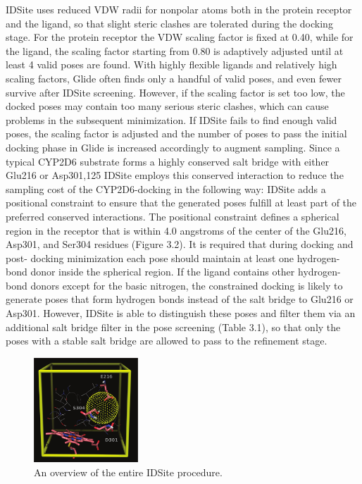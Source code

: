 IDSite uses reduced VDW radii for nonpolar atoms both in the protein receptor and the ligand, so that slight steric clashes are tolerated during the docking stage.
For the protein receptor the VDW scaling factor is fixed at 0.40, while for the ligand, the scaling factor starting from 0.80 is adaptively adjusted until at least 4 valid poses are found.
With highly flexible ligands and relatively high scaling factors, Glide often finds only a handful of valid poses, and even fewer survive after IDSite screening.
However, if the scaling factor is set too low, the docked poses may contain too many serious steric clashes, which can cause problems in the subsequent minimization.
If IDSite fails to find enough valid poses, the scaling factor is adjusted and the number of poses to pass the initial docking phase in Glide is increased accordingly to augment sampling.
Since a typical CYP2D6 substrate forms a highly conserved salt bridge with either Glu216 or Asp301,125 IDSite employs this conserved interaction to reduce the sampling cost of the CYP2D6-docking in the following way: IDSite adds a positional constraint to ensure that the generated poses fulfill at least part of the preferred conserved interactions.
The positional constraint defines a spherical region in the receptor that is within 4.0 angstroms of the center of the Glu216, Asp301, and Ser304 residues (Figure 3.2).
It is required that during docking and post- docking minimization each pose should maintain at least one hydrogen-bond donor inside the spherical region.
If the ligand contains other hydrogen-bond donors except for the basic nitrogen, the constrained docking is likely to generate poses that form hydrogen bonds instead of the salt bridge to Glu216 or Asp301.
However, IDSite is able to distinguish these poses and filter them via an additional salt bridge filter in the pose screening (Table 3.1), so that only the poses with a stable salt bridge are allowed to pass to the refinement stage.

\begin{figure}[h]
\centering
\includegraphics[width=0.35\textwidth]{figures/idsite/glide.png}
\caption{An overview of the entire IDSite procedure.}
\label{fig:idsite_glide}
\end{figure}
